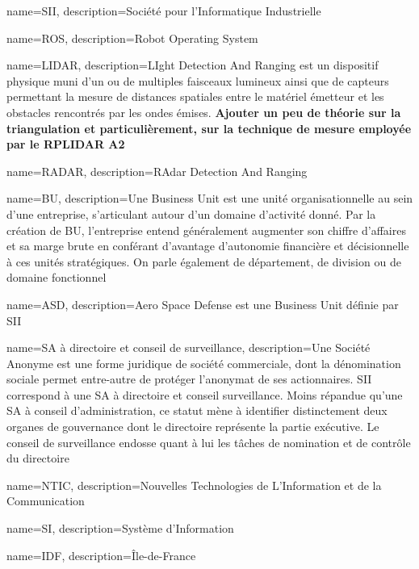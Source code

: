 \makeglossary

{
  name={SII},
    description={Société pour l'Informatique Industrielle}
}

{
  name={ROS},
    description={Robot Operating System}
}

{
  name={LIDAR},
    description={LIght Detection And Ranging est un dispositif physique muni d'un ou de multiples faisceaux lumineux ainsi que de capteurs permettant la mesure de distances spatiales entre le matériel émetteur et les obstacles rencontrés par les ondes émises.
    \textbf{Ajouter un peu de théorie sur la triangulation et particulièrement, sur la technique de mesure employée par le RPLIDAR A2} }
}

{
  name={RADAR},
    description={RAdar Detection And Ranging}
}

{
  name={BU},
    description={Une Business Unit est une unité organisationnelle au sein d'une entreprise, s'articulant autour d'un domaine d'activité donné. Par la création de BU, 
    l'entreprise entend généralement augmenter son chiffre d'affaires et sa marge brute en conférant 
    d'avantage d'autonomie financière et décisionnelle à ces unités stratégiques. On parle également de département, de division ou de domaine fonctionnel}
}

{
  name={ASD},
    description={Aero Space Defense est une Business Unit définie par SII}
}

{
  name={SA \`{a} directoire et conseil de surveillance},
    description={Une Société Anonyme est une forme juridique de société commerciale, dont la dénomination sociale permet entre-autre de protéger l'anonymat de ses actionnaires. 
    SII correspond à une SA à directoire et conseil surveillance.
    Moins répandue qu'une SA à conseil d'administration\cite{Bib_SA_wiki}, ce statut mène à identifier distinctement deux organes de gouvernance dont le directoire représente la partie exécutive. 
    Le conseil de surveillance endosse quant à lui les tâches de nomination et de contrôle du directoire}
}

{
  name={NTIC},
    description={Nouvelles Technologies de L'Information et de la Communication}
}

{
  name={SI},
    description={Système d'Information}
}

{
  name={IDF},
    description={\^{I}le-de-France}
}

